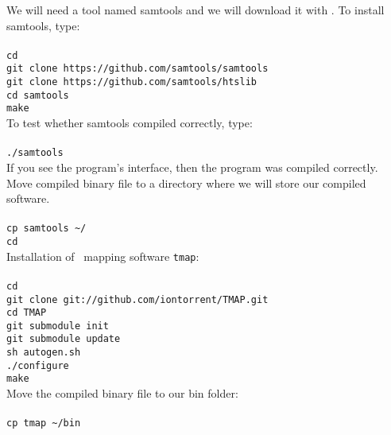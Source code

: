 We will need a tool named samtools and we will download it with \git.
To install samtools, type:\\~\\
\texttt{cd \progDir}\\
\texttt{git clone https://github.com/samtools/samtools}\\
\texttt{git clone https://github.com/samtools/htslib}\\
\texttt{cd samtools}\\
\texttt{make}\\

To test whether samtools compiled correctly, type:\\~\\
\texttt{./samtools}\\

If you see the program's interface, then the program was compiled correctly.
Move compiled binary file to a directory where we will store our compiled software.\\~\\
\texttt{cp samtools \textasciitilde/\binDir\\
cd}\\

Installation of \IonTorrent~mapping software \texttt{tmap}:\\~\\
\texttt{cd \progDir}\\
\texttt{git clone git://github.com/iontorrent/TMAP.git}\\
\texttt{cd TMAP}\\
\texttt{git submodule init}\\
\texttt{git submodule update}\\
\texttt{sh autogen.sh}\\
\texttt{./configure}\\
\texttt{make}\\

Move the compiled binary file to our bin folder:\\~\\
\texttt{cp tmap \textasciitilde/bin\\}





